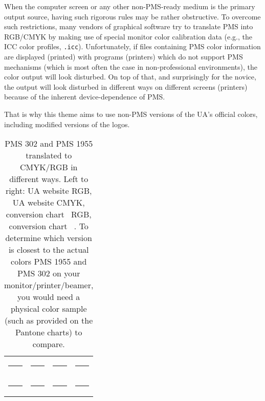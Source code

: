 When the computer screen or any other non-PMS-ready medium is the primary
output source, having such rigorous rules may be rather obstructive. To
overcome such restrictions, many vendors of graphical software try to translate
PMS into RGB/CMYK by making use of special monitor color calibration data
(e.g., the ICC color profiles, \lstinline!.icc!). Unfortunately, if files
containing PMS color information are displayed (printed) with programs
(printers) which do not support PMS mechanisms (which is most often the case in
non-professional environments), the color output will look disturbed. On top of
that, and surprisingly for the novice, the output will look disturbed in
different ways on different screens (printers) because of the inherent
device-dependence of PMS.

That is why this theme aims to use non-PMS versions of the UA's official
colors, including modified versions of the logos.

\begin{table}
\centering
\newlength{\boxsize}
\setlength{\boxsize}{2cm}

\begin{tabular}{cccc}
\definecolor{uablue11}{RGB}{  0, 61,100}
\colorbox{uablue11}{\rule{0mm}{\boxsize}\rule{\boxsize}{0mm}}
&
\definecolor{uablue12}{cmyk}{1,0.3,0,0.62}
\colorbox{uablue12}{\rule{0mm}{\boxsize}\rule{\boxsize}{0mm}}
&
\definecolor{uablue13}{RGB}{0,96,128}
\colorbox{uablue13}{\rule{0mm}{\boxsize}\rule{\boxsize}{0mm}}
&
\definecolor{uablue14}{cmyk}{1,0.25,0,0.5}
\colorbox{uablue14}{\rule{0mm}{\boxsize}\rule{\boxsize}{0mm}}\\[2mm]
\definecolor{uared11}{RGB}{126,  0, 47}
\colorbox{uared11}{\rule{0mm}{\boxsize}\rule{\boxsize}{0mm}}
&
\definecolor{uared11}{cmyk}{0,1,0.54,0.46}
\colorbox{uared11}{\rule{0mm}{\boxsize}\rule{\boxsize}{0mm}}
&
\definecolor{uared11}{RGB}{161,0,64}
\colorbox{uared11}{\rule{0mm}{\boxsize}\rule{\boxsize}{0mm}}
&
\definecolor{uared11}{cmyk}{0,1,0.6,0.37}
\colorbox{uared11}{\rule{0mm}{\boxsize}\rule{\boxsize}{0mm}}
\end{tabular}

\caption{PMS 302 and PMS 1955 translated to CMYK/RGB in different ways. Left to
right: UA website \cite{KAN::} RGB, UA website \cite{KAN::} CMYK, conversion
chart~\cite{::TDC} RGB, conversion chart~\cite{::TDC} \@CMYK. To determine which
version is closest to the actual colors PMS 1955 and PMS 302 on your
monitor/printer/beamer, you would need a physical color sample (such as
provided on the Pantone\textsuperscript{\textregistered} charts) to compare.}
\label{table:reds-blues}
\end{table}

